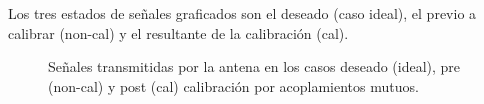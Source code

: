 Los tres estados de señales graficados son el deseado (caso ideal), el previo a calibrar (non-cal) y el resultante de la
calibración (cal).
\begin{figure}[H]
	\centering

	\caption{Señales transmitidas por la antena en los casos deseado (ideal), pre (non-cal) y post (cal) calibración por acoplamientos mutuos.}
	\label{fig:chirpErrMutual10degRow}
\end{figure}

